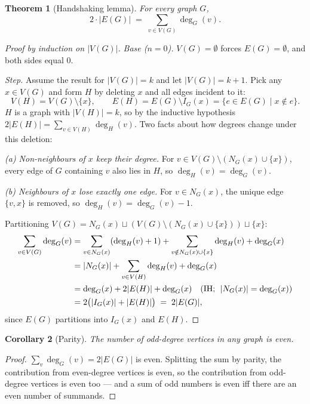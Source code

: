 \documentclass[11pt]{article}
\theoremstyle{defstyle}
\theoremstyle{thmstyle}
\newtheorem{theorem}{Theorem}[section]
\newtheorem{corollary}[theorem]{Corollary}
\theoremstyle{notstyle}
\theoremstyle{cautionstyle}
\newcommand{\card}[1]{\lvert #1 \rvert}
\begin{document}
\begin{thmbox}
\begin{theorem}[Handshaking lemma]
For every graph $G$,
\[
  2 \cdot \card{E(G)} \;=\; \sum_{v \in V(G)} \deg_G(v).
\]
\end{theorem}
\begin{proof}[Proof by induction on $\card{V(G)}$]
\textit{Base ($n = 0$).}\;
$V(G) = \emptyset$ forces $E(G) = \emptyset$, and both sides equal $0$.

\smallskip
\textit{Step.}\;
Assume the result for $\card{V(G)} = k$ and let $\card{V(G)} = k + 1$.
Pick any $x \in V(G)$ and form $H$ by deleting $x$ and all edges incident
to it:
\[
  V(H) = V(G) \setminus \{x\},\qquad
  E(H) = E(G) \setminus I_G(x) = \{e \in E(G) \mid x \notin e\}.
\]
$H$ is a graph with $\card{V(H)} = k$, so by the inductive hypothesis
$2 \card{E(H)} = \sum_{v \in V(H)} \deg_H(v)$. Two facts about how degrees
change under this deletion:

\smallskip
\emph{(a) Non-neighbours of $x$ keep their degree.}\;
For $v \in V(G) \setminus (N_G(x) \cup \{x\})$, every edge of $G$
containing $v$ also lies in $H$, so $\deg_H(v) = \deg_G(v)$.

\smallskip
\emph{(b) Neighbours of $x$ lose exactly one edge.}\;
For $v \in N_G(x)$, the unique edge $\{v, x\}$ is removed, so
$\deg_H(v) = \deg_G(v) - 1$.

\smallskip
Partitioning $V(G) = N_G(x) \sqcup (V(G) \setminus (N_G(x) \cup \{x\})) \sqcup \{x\}$:
\begin{align*}
  \sum_{v \in V(G)} \deg_G(v)
  &= \sum_{v \in N_G(x)} (\deg_H(v) + 1)
   + \sum_{v \notin N_G(x) \cup \{x\}} \deg_H(v)
   + \deg_G(x) \\
  &= \card{N_G(x)} + \sum_{v \in V(H)} \deg_H(v) + \deg_G(x) \\
  &= \deg_G(x) + 2\card{E(H)} + \deg_G(x)
     \quad \text{(IH; \;$\card{N_G(x)} = \deg_G(x)$)} \\
  &= 2\bigl(\card{I_G(x)} + \card{E(H)}\bigr)
   \;=\; 2 \card{E(G)},
\end{align*}
since $E(G)$ partitions into $I_G(x)$ and $E(H)$.
\end{proof}
\end{thmbox}

\begin{thmbox}
\begin{corollary}[Parity]
The number of odd-degree vertices in any graph is even.
\end{corollary}
\begin{proof}
$\sum_v \deg_G(v) = 2 \card{E(G)}$ is even.  Splitting the sum by parity,
the contribution from even-degree vertices is even, so the contribution
from odd-degree vertices is even too --- and a sum of odd numbers is even
iff there are an even number of summands.
\end{proof}
\end{thmbox}
\end{document}
